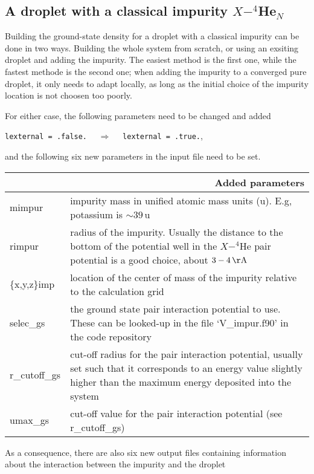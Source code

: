 \documentclass[10pt,a4paper]{article}
\begin{document}
	\subsection{A droplet with a classical impurity $X-^4$He$_{N}$}
	
	Building the ground-state density for a droplet with a classical impurity can be done in two ways. Building the whole system from scratch, or using an exsiting droplet and adding the impurity. The easiest method is the first one, while the fastest methode is the second one; when adding the impurity to a converged pure droplet, it only needs to adapt locally, as long as the initial choice of the impurity location is not choosen too poorly.
	
	For either case, the following parameters need to be changed and added
	\begin{center}
	\verb|lexternal = .false.|	$\quad\Longrightarrow\quad$	\verb|lexternal = .true.|,
	\end{center}
	and the following six new parameters in the input file need to be set.

	\begin{center}
	\begin{tabular}{l|p{9.75cm}}
		\multicolumn{2}{r}{\textbf{Added parameters}} \\
		\hline\hline
		mimpur 			& impurity mass in unified atomic mass units (u). E.g, potassium is $\sim\!39\,\mathrm{u}$ 	\\
		rimpur			& radius of the impurity. Usually the distance to the bottom of the potential well in the $X-^4$He pair potential is a good choice, about $3-4\,\mathrm{\AA}$	\\
		\{x,y,z\}imp	& location of the center of mass of the impurity relative to the calculation grid	\\
		selec\_gs		& the ground state pair interaction potential to use. These can be looked-up in the file `V\_impur.f90' in the code repository\\
		r\_cutoff\_gs	& cut-off radius for the pair interaction potential, usually set such that it corresponds to an energy value slightly higher than the maximum energy deposited into the system 	\\
		umax\_gs 		& cut-off value for the pair interaction potential (see r\_cutoff\_gs)
	\end{tabular}
	\end{center}
	\vspace{0.2cm}
	As a consequence, there are also six new output files containing information about the interaction between the impurity and the droplet
	
\end{document}
